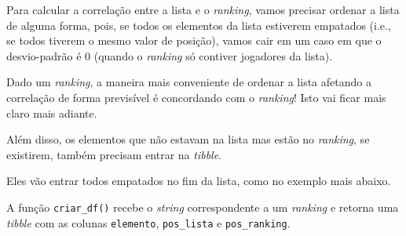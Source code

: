 \documentclass[
  letterpaper,
  DIV=11,
  numbers=noendperiod]{scrreprt}
\begin{document}
Para calcular a correlação entre a lista e o \emph{ranking}, vamos
precisar ordenar a lista de alguma forma, pois, se todos os elementos da
lista estiverem empatados (i.e., se todos tiverem o mesmo valor de
posição), vamos cair em um caso em que o desvio-padrão é $0$ (quando o
\emph{ranking} só contiver jogadores da lista).

Dado um \emph{ranking}, a maneira mais conveniente de ordenar a lista
afetando a correlação de forma previsível é concordando com o
\emph{ranking}! Isto vai ficar mais claro mais adiante.

Além disso, os elementos que não estavam na lista mas estão no
\emph{ranking}, se existirem, também precisam entrar na \emph{tibble}.

Eles vão entrar todos empatados no fim da lista, como no exemplo mais
abaixo.

A função \texttt{criar\_df()} recebe o \emph{string} correspondente a um
\emph{ranking} e retorna uma \emph{tibble} com as colunas
\texttt{elemento}, \texttt{pos\_lista} e \texttt{pos\_ranking}.
\end{document}
